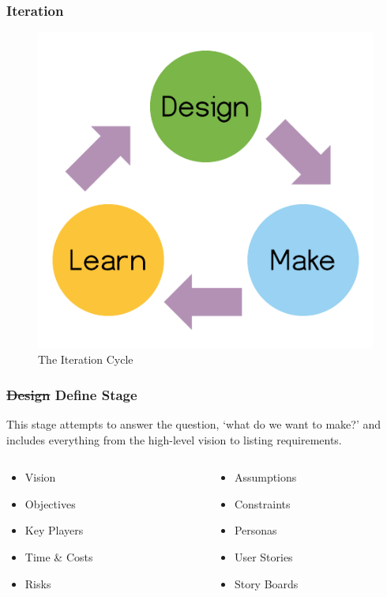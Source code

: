 \begin{frame}
	\frametitle{Iteration}
	\begin{figure}
		\includegraphics[scale=0.4]{assets/iteration.png}
		\caption{The Iteration Cycle}
	\end{figure}
\end{frame}


\begin{frame}
	\frametitle{ \st{Design} Define Stage}
	This stage attempts to answer the question, `what do we want to make?' and includes everything from the high-level vision to listing requirements.
	\pause
	\begin{columns}
		\begin{column}{0.5\textwidth}
			\begin{itemize}
				\item Vision
				\item Objectives 
				\item Key Players				
				\item Time \& Costs
				\item Risks
			\end{itemize}
   		\end{column}
		
		\begin{column}{0.5\textwidth}  
			\begin{itemize}
				\item Assumptions
				\item Constraints
				\item Personas		
				\item User Stories
				\item Story Boards
			\end{itemize}
		\end{column}
	\end{columns}
\end{frame}

